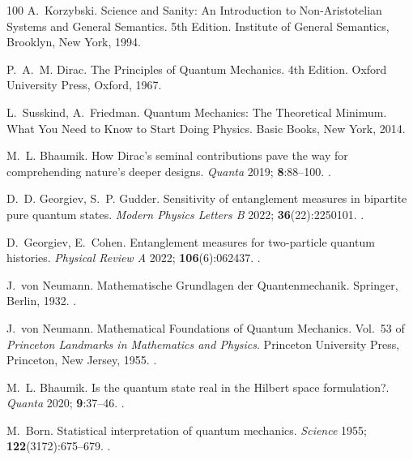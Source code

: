 \documentclass{ws-ijmpb}
\begin{document}
\begin{thebibliography}{100}
A.~Korzybski. Science and Sanity: An Introduction to Non-Aristotelian Systems
  and General Semantics. 5th Edition. Institute of General Semantics, Brooklyn,
  New York, 1994.

P.~A.~M. Dirac. The Principles of Quantum Mechanics. 4th Edition. Oxford
  University Press, Oxford, 1967.

L.~Susskind, A.~Friedman. Quantum Mechanics: The Theoretical Minimum. What You
  Need to Know to Start Doing Physics. Basic Books, New York, 2014.

M.~L. Bhaumik. How {D}irac's seminal contributions pave the way for
  comprehending nature's deeper designs. \emph{Quanta} 2019;
  \textbf{8}:88--100.
\newblock \href {http://doi.org/10.12743/quanta.v8i1.96}
  {}.

D.~D. Georgiev, S.~P. Gudder. Sensitivity of entanglement measures in bipartite
  pure quantum states. \emph{Modern Physics Letters B} 2022;
  \textbf{36}(22):2250101.
\newblock \href {http://doi.org/10.1142/S0217984922501019}
  {}.

D.~Georgiev, E.~Cohen. Entanglement measures for two-particle quantum
  histories. \emph{Physical Review A} 2022; \textbf{106}(6):062437.
\newblock \href {http://doi.org/10.1103/PhysRevA.106.062437}
  {}.

J.~von Neumann. Mathematische Grundlagen der Quantenmechanik. Springer, Berlin,
  1932.
\newblock \href {http://doi.org/10.1007/978-3-642-61409-5}
  {}.

J.~von Neumann. Mathematical Foundations of Quantum Mechanics. Vol.~53 of
  \emph{Princeton Landmarks in Mathematics and Physics}. Princeton University
  Press, Princeton, New Jersey, 1955.
\newblock \href {http://doi.org/10.1515/9781400889921}
  {}.

M.~L. Bhaumik. Is the quantum state real in the {H}ilbert space formulation?.
  \emph{Quanta} 2020; \textbf{9}:37--46.
\newblock \href {http://doi.org/10.12743/quanta.v9i1.142}
  {}.

M.~Born. Statistical interpretation of quantum mechanics. \emph{Science} 1955;
  \textbf{122}(3172):675--679.
\newblock \href {http://doi.org/10.1126/science.122.3172.675}
  {}.


\end{thebibliography}
\end{document}

